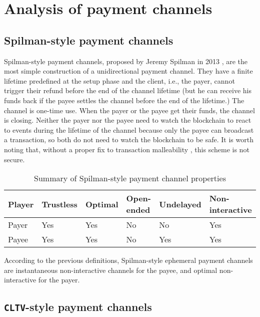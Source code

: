 \section{Analysis of payment channels}

\subsection{Spilman-style payment channels}

Spilman-style payment channels, proposed by Jeremy Spilman in 2013
\cite{SpilmanStyle}, are the most simple construction of a unidirectional
payment channel. They have a finite lifetime predefined at the setup phase and
the client, i.e., the payer, cannot trigger their refund before the end of the
channel lifetime (but he can receive his funds back if the payee settles the
channel before the end of the lifetime.) The channel is one-time use. When the
payer or the payee get their funds, the channel is closing. Neither the payer nor the
payee need to watch the blockchain to react to events during the lifetime of
the channel because only the payee can broadcast a transaction, so both do not
need to watch the blockchain to be safe. It is worth noting that, without a
proper fix to transaction malleability \cite{SegWitBIP, BIP62,
DBLP:journals/corr/AndrychowiczDMM13, DBLP:journals/corr/DeckerW14}, this scheme
is not secure.

\begin{table}[h]
  \begin{tabularx}{\textwidth}{ | X | l | l | l | l | l |}
  \hline
  Player & Trustless & Optimal & Open-ended & Undelayed & Non-interactive \\ \hline \hline
  Payer & Yes & Yes & No & No & Yes \\ \hline
  Payee & Yes & Yes & No & Yes & Yes \\
  \hline
  \end{tabularx}
  \caption{Summary of Spilman-style payment channel properties}
  \label{fig:summarySpilmanPaymentChannel}
\end{table}

According to the previous definitions, Spilman-style ephemeral payment channels are
instantaneous non-interactive channels for the payee, and optimal non-interactive for
the payer.

\subsection{\texttt{CLTV}-style payment channels}


